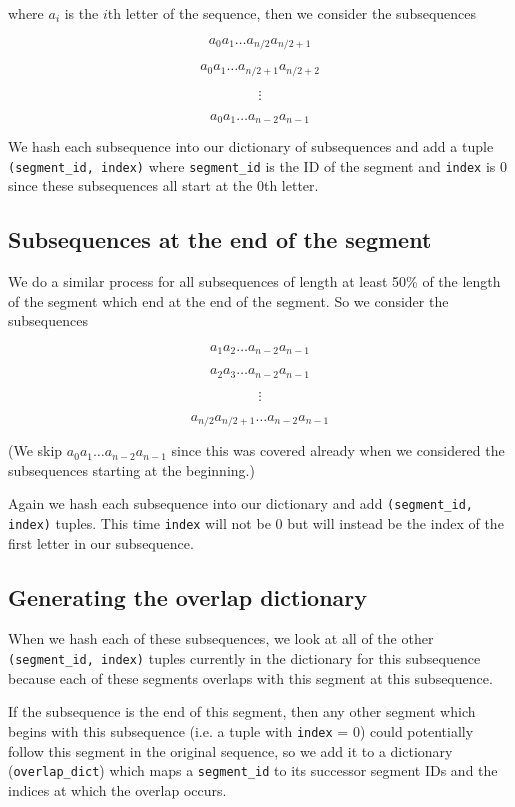 \documentclass{article}
\begin{document}
where $a_i$ is the $i$th letter of the sequence, then we consider the subsequences

$$a_0 a_1 \dots a_{n/2} a_{n/2+1}$$

$$a_0 a_1 \dots a_{n/2+1} a_{n/2+2}$$

$$\vdots$$

$$a_0 a_1 \dots a_{n-2} a_{n-1}$$

We hash each subsequence into our dictionary of subsequences and add a tuple \texttt{(segment\_id, index)} where \texttt{segment\_id} is the ID of the segment and \texttt{index} is 0 since these subsequences all start at the 0th letter.

\subsection{Subsequences at the end of the segment}

We do a similar process for all subsequences of length at least 50\% of the length of the segment which end at the end of the segment. So we consider the subsequences

$$a_1 a_2 \dots a_{n-2} a_{n-1}$$

$$a_2 a_3 \dots a_{n-2} a_{n-1}$$

$$\vdots$$

$$a_{n/2} a_{n/2+1} \dots a_{n-2} a_{n-1}$$

(We skip $a_0 a_1 \dots a_{n-2} a_{n-1}$ since this was covered already when we considered the subsequences starting at the beginning.)

Again we hash each subsequence into our dictionary and add \texttt{(segment\_id, index)} tuples. This time \texttt{index} will not be 0 but will instead be the index of the first letter in our subsequence.

\subsection{Generating the overlap dictionary}

When we hash each of these subsequences, we look at all of the other \texttt{(segment\_id, index)} tuples currently in the dictionary for this subsequence because each of these segments overlaps with this segment at this subsequence.

If the subsequence is the end of this segment, then any other segment which begins with this subsequence (i.e. a tuple with \texttt{index} = 0) could potentially follow this segment in the original sequence, so we add it to a dictionary (\texttt{overlap\_dict}) which maps a \texttt{segment\_id} to its successor segment IDs and the indices at which the overlap occurs.
\end{document}
